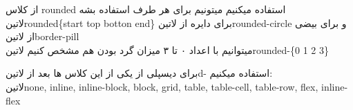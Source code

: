 \documentclass{article}
\begin{document}
		 از کلاس rounded استفاده میکنیم میتونیم برای هر طرف استفاده بشه \\
		‌لاتین{rounded\{start top botton end\}} برای دایره از ‌لاتین{rounded-circle} و برای بیضی از ‌لاتین{border-pill}\\
		میتوانیم با اعداد ۰ تا ۳ میزان گرد بودن هم مشخص کنیم ‌لاتین{rounded-\{0 1 2 3\}}
		
		
		برای دیسپلی از یکی از این کلاس ها بعد از ‌لاتین{d-} استفاده میکنیم:\\ 
		‌لاتین{none, inline, inline-block, block, grid, table, table-cell, table-row, flex, inline-flex}\\
		
\end{document}
